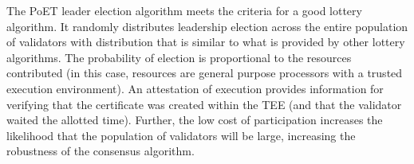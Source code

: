 The PoET leader election algorithm meets the criteria for a good lottery algorithm. It randomly distributes leadership
election across the entire population of validators with distribution that is similar to what is provided by other
lottery algorithms. The probability of election is proportional to the resources contributed (in this case, resources
are general purpose processors with a trusted execution environment). An attestation of execution provides information
for verifying that the certificate was created within the TEE (and that the validator waited the allotted
time). Further, the low cost of participation increases the likelihood that the population of validators will be large,
increasing the robustness of the consensus algorithm.
